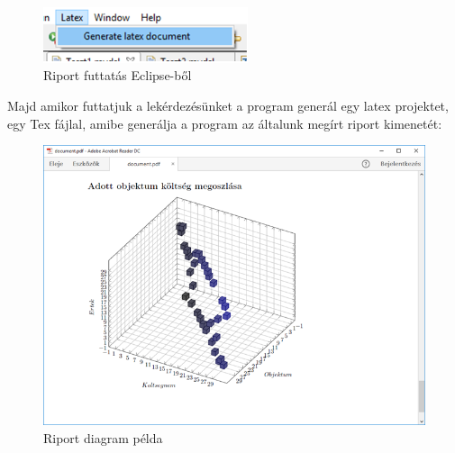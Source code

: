\begin{figure}[!ht]
\centering
\includegraphics[width=60mm, keepaspectratio]{figures/run.png}
\caption{Riport futtatás Eclipse-ből} 
\label{fig:Overview}
\end{figure}

\newpage
Majd amikor futtatjuk a lekérdezésünket a program generál egy latex projektet,
egy Tex fájlal, amibe generálja a program az általunk megírt riport kimenetét:

 \begin{figure}[!ht]
\centering
\includegraphics[width=120mm, keepaspectratio]{figures/Report.png}
\caption{Riport diagram példa} 
\label{fig:Overview}
\end{figure}





